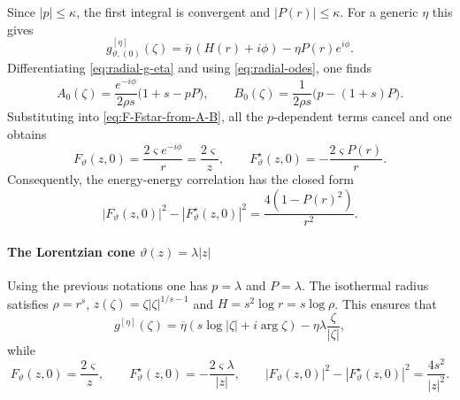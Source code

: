 \documentclass[reqno]{amsart}
\numberwithin{equation}{section}
\theoremstyle{definition}
\theoremstyle{remark}
\begin{document}
Since $|p|\leq\kappa$, the first integral is convergent and $|P(r)|\leq\kappa$. For a generic $\eta$ this gives
\begin{equation}\label{eq:radial-g-eta}
        g^{[\eta]}_{\vartheta,(0)}(\zeta)
        =\overline\eta\,(H(r)+i\phi)-\eta P(r)e^{i\phi}.
\end{equation}
Differentiating \eqref{eq:radial-g-eta} and using \eqref{eq:radial-odes}, one finds
\[
        A_0(\zeta)=\frac{e^{-i\phi}}{2\rho s}\bigl(1+s-pP\bigr),
        \qquad
        B_0(\zeta)=\frac{1}{2\rho s}\bigl(p-(1+s)P\bigr).
\]
Substituting into \eqref{eq:F-Fstar-from-A-B}, all the $p$-dependent terms cancel and one obtains
\begin{equation*}
	 F_\vartheta(z,0)=\frac{2\varsigma e^{-i\phi}}{r}=\frac{2\varsigma}{z}, \qquad 
        F^\star_\vartheta(z,0)=-\frac{2\varsigma P(r)}{r}.
\end{equation*}
Consequently, the energy-energy correlation has the closed form
\begin{equation}\label{eq:radial-energy-scalar}
        |F_\vartheta(z,0)|^2-|F^\star_\vartheta(z,0)|^2
        =\frac{4(1-P(r)^2)}{r^2}.
\end{equation}

\paragraph{\textbf{The Lorentzian cone} $\vartheta(z)=\lambda |z|$} Using the previous notations one has $p=\lambda$ and $P=\lambda$. The isothermal radius satisfies $\rho=r^s$, $z(\zeta)=\zeta|\zeta|^{1/s-1}$ and $H=s^2\log r=s\log\rho$. This ensures that
\begin{equation}\label{eq:cone-g}
        g^{[\eta]}(\zeta)
        =\overline\eta\left(s\log|\zeta|+i\arg\zeta\right)
        -\eta\lambda\frac{\zeta}{|\zeta|},
\end{equation}
while
\begin{equation}\label{eq:cone-F-Fstar}
        F_\vartheta(z,0)=\frac{2\varsigma}{z},
        \qquad
        F^\star_\vartheta(z,0)=-\frac{2\varsigma\lambda}{|z|},
        \qquad
        |F_\vartheta(z,0)|^2-|F^\star_\vartheta(z,0)|^2
        =\frac{4s^2}{|z|^2}.
\end{equation}
\end{document}
